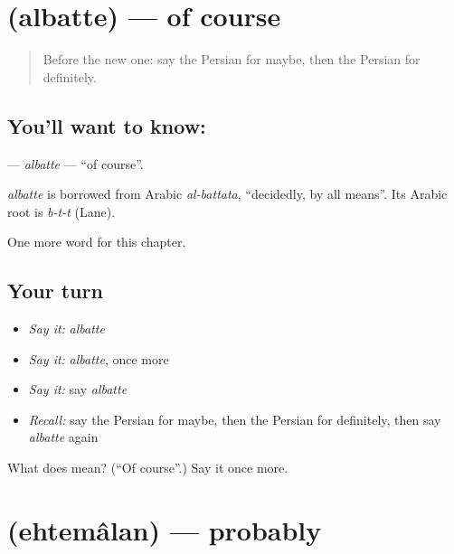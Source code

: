 \section[\texorpdfstring{\fa{البته} (albatte)}{البته (albatte)}]{ (albatte) — of course}

\label{lesson:FA-C233-albatte}



\begin{quote}
Before the new one: say the Persian for maybe, then the Persian for definitely.
\end{quote}

\subsection*{You'll want to know: }
\textbf{} — \emph{albatte} — \textquotedblleft{}of course\textquotedblright{}.

\begin{cousinweb}
\emph{albatte} is borrowed from Arabic \emph{al-battata}, \textquotedblleft{}decidedly, by all means\textquotedblright{}. Its Arabic root is \emph{b-t-t} (Lane).
\end{cousinweb}

\begin{grammarlens}[title={What you've built}]
One more word for this chapter.
\end{grammarlens}

\subsection*{Your turn}
\begin{itemize}
\raggedright
  \item \emph{Say it:} \emph{albatte}
  \item \emph{Say it:} \emph{albatte}, once more
  \item \emph{Say it:} say \emph{albatte}
  \item \emph{Recall:} say the Persian for maybe, then the Persian for definitely, then say \emph{albatte} again
\end{itemize}

\begin{tcolorbox}[breakable,colback=teal!4,colframe=teal!35!black,title={Before you move on}]
What does  mean? (\textquotedblleft{}Of course\textquotedblright{}.) Say it once more.
\end{tcolorbox}
\section[\texorpdfstring{\fa{احتمالا} (ehtemâlan)}{احتمالا (ehtemâlan)}]{ (ehtemâlan) — probably}

